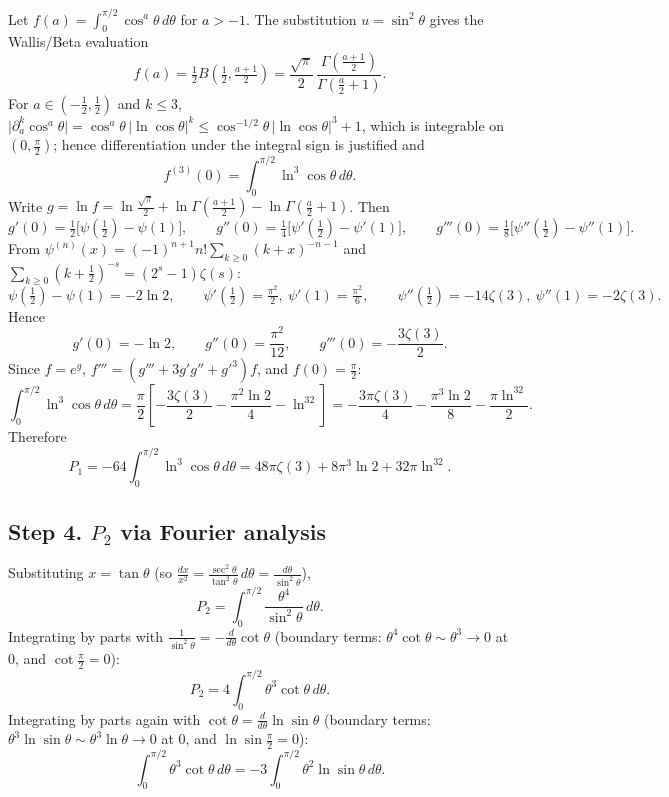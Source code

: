 \documentclass[11pt]{article}
\theoremstyle{remark}
\begin{document}
Let $f(a)=\int_0^{\pi/2}\cos^a\theta\,d\theta$ for $a>-1$. The substitution $u=\sin^2\theta$ gives the Wallis/Beta evaluation
\[
f(a)=\tfrac12B\!\left(\tfrac12,\tfrac{a+1}2\right)=\frac{\sqrt{\pi}}{2}\,\frac{\Gamma\!\left(\frac{a+1}{2}\right)}{\Gamma\!\left(\frac{a}{2}+1\right)} .
\]
For $a\in(-\tfrac12,\tfrac12)$ and $k\le3$, $\bigl|\partial_a^k\cos^a\theta\bigr|=\cos^a\theta\,|\ln\cos\theta|^k\le\cos^{-1/2}\theta\,|\ln\cos\theta|^3+1$, which is integrable on $(0,\tfrac\pi2)$; hence differentiation under the integral sign is justified and
\[
f^{(3)}(0)=\int_0^{\pi/2}\ln^3\cos\theta\,d\theta .
\]
Write $g=\ln f=\ln\tfrac{\sqrt\pi}{2}+\ln\Gamma\!\left(\tfrac{a+1}2\right)-\ln\Gamma\!\left(\tfrac a2+1\right)$. Then
\[
g'(0)=\tfrac12\bigl[\psi(\tfrac12)-\psi(1)\bigr],\qquad
g''(0)=\tfrac14\bigl[\psi'(\tfrac12)-\psi'(1)\bigr],\qquad
g'''(0)=\tfrac18\bigl[\psi''(\tfrac12)-\psi''(1)\bigr].
\]
From $\psi^{(n)}(x)=(-1)^{n+1}n!\sum_{k\ge0}(k+x)^{-n-1}$ and $\sum_{k\ge0}(k+\tfrac12)^{-s}=(2^s-1)\zeta(s)$:
\[
\psi(\tfrac12)-\psi(1)=-2\ln2,\qquad
\psi'(\tfrac12)=\tfrac{\pi^2}{2},\ \psi'(1)=\tfrac{\pi^2}{6},\qquad
\psi''(\tfrac12)=-14\zeta(3),\ \psi''(1)=-2\zeta(3).
\]
Hence
\[
g'(0)=-\ln2,\qquad g''(0)=\frac{\pi^2}{12},\qquad g'''(0)=-\frac{3\zeta(3)}{2}.
\]
Since $f=e^g$, $f'''=(g'''+3g'g''+g'^3)f$, and $f(0)=\tfrac\pi2$:
\[
\int_0^{\pi/2}\ln^3\cos\theta\,d\theta
=\frac{\pi}{2}\left[-\frac{3\zeta(3)}{2}-\frac{\pi^2\ln2}{4}-\ln^32\right]
=-\frac{3\pi\zeta(3)}{4}-\frac{\pi^3\ln2}{8}-\frac{\pi\ln^32}{2}.
\]
Therefore
\[
P_1=-64\int_0^{\pi/2}\ln^3\cos\theta\,d\theta
=48\pi\zeta(3)+8\pi^3\ln2+32\pi\ln^32 .
\]

\subsection*{Step 4. $P_2$ via Fourier analysis}

Substituting $x=\tan\theta$ (so $\frac{dx}{x^2}=\frac{\sec^2\theta}{\tan^2\theta}\,d\theta=\frac{d\theta}{\sin^2\theta}$),
\[
P_2=\int_0^{\pi/2}\frac{\theta^4}{\sin^2\theta}\,d\theta .
\]
Integrating by parts with $\frac{1}{\sin^2\theta}=-\frac{d}{d\theta}\cot\theta$ (boundary terms: $\theta^4\cot\theta\sim\theta^3\to0$ at $0$, and $\cot\tfrac\pi2=0$):
\[
P_2=4\int_0^{\pi/2}\theta^3\cot\theta\,d\theta .
\]
Integrating by parts again with $\cot\theta=\frac{d}{d\theta}\ln\sin\theta$ (boundary terms: $\theta^3\ln\sin\theta\sim\theta^3\ln\theta\to0$ at $0$, and $\ln\sin\tfrac\pi2=0$):
\[
\int_0^{\pi/2}\theta^3\cot\theta\,d\theta=-3\int_0^{\pi/2}\theta^2\ln\sin\theta\,d\theta .
\]
\end{document}
